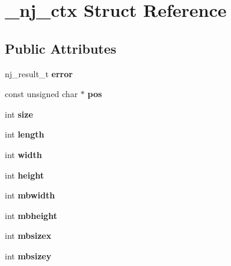 \hypertarget{struct__nj__ctx}{}\section{\+\_\+nj\+\_\+ctx Struct Reference}
\label{struct__nj__ctx}
\subsection*{Public Attributes}
\begin{DoxyCompactItemize}
\item 
\mbox{\label{struct__nj__ctx_ac3f3ab1b3ae57d8dd3509f0972f96eee}} 
nj\+\_\+result\+\_\+t {\bfseries error}
\item 
\mbox{\label{struct__nj__ctx_ace4cfe6efb9fdbd09410dbd5427689e4}} 
const unsigned char $\ast$ {\bfseries pos}
\item 
\mbox{\label{struct__nj__ctx_a3641a18f116e4f57c37ac9b1c3ef8f41}} 
int {\bfseries size}
\item 
\mbox{\label{struct__nj__ctx_a5a6fce34da496c91aafd5f29e0ea6925}} 
int {\bfseries length}
\item 
\mbox{\label{struct__nj__ctx_aee6566c2595d4acfb481ada99b8fb0dc}} 
int {\bfseries width}
\item 
\mbox{\label{struct__nj__ctx_ab169f13527528361fa4475159fb86a7b}} 
int {\bfseries height}
\item 
\mbox{\label{struct__nj__ctx_af86177b111f41addcf64d55ca9bdb070}} 
int {\bfseries mbwidth}
\item 
\mbox{\label{struct__nj__ctx_ae8f5def6e7efa9345dbbde7a2d667190}} 
int {\bfseries mbheight}
\item 
\mbox{\label{struct__nj__ctx_ae6c051707045a90d27b3cf158ede3abb}} 
int {\bfseries mbsizex}
\item 
\mbox{\label{struct__nj__ctx_a862aa23e729730482db6b9b0bc14a900}} 
int {\bfseries mbsizey}
\item 

\end{DoxyCompactItemize}
